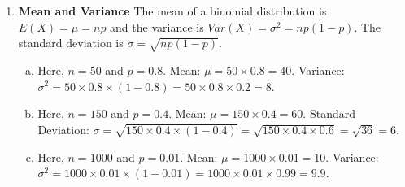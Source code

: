 \documentclass{article}
\begin{document}
\begin{enumerate}
    \item \textbf{Mean and Variance}
    The mean of a binomial distribution is $E(X) = \mu = np$ and the variance is $Var(X) = \sigma^2 = np(1-p)$. The standard deviation is $\sigma = \sqrt{np(1-p)}$.
    \begin{enumerate}[a)]
        \item Here, $n=50$ and $p=0.8$.
        Mean: $\mu = 50 \times 0.8 = 40$.
        Variance: $\sigma^2 = 50 \times 0.8 \times (1-0.8) = 50 \times 0.8 \times 0.2 = 8$.
        \item Here, $n=150$ and $p=0.4$.
        Mean: $\mu = 150 \times 0.4 = 60$.
        Standard Deviation: $\sigma = \sqrt{150 \times 0.4 \times (1-0.4)} = \sqrt{150 \times 0.4 \times 0.6} = \sqrt{36} = 6$.
        \item Here, $n=1000$ and $p=0.01$.
        Mean: $\mu = 1000 \times 0.01 = 10$.
        Variance: $\sigma^2 = 1000 \times 0.01 \times (1-0.01) = 1000 \times 0.01 \times 0.99 = 9.9$.
    \end{enumerate}
\end{enumerate}
\end{document}
